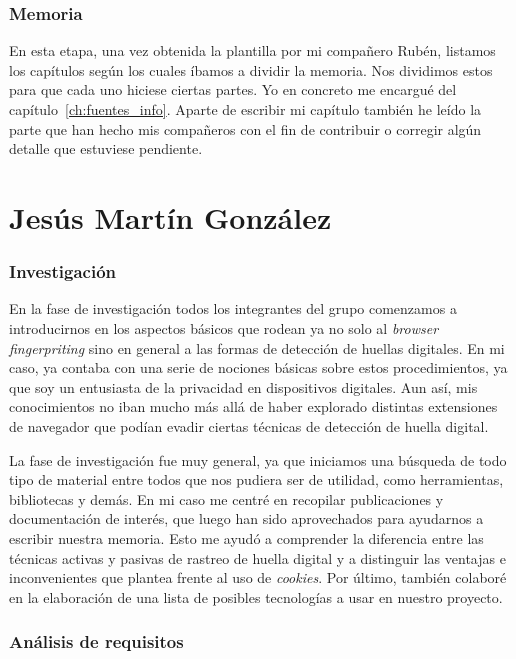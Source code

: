 \subsubsection{Memoria}
En esta etapa, una vez obtenida la plantilla por mi compañero Rubén, listamos los capítulos según los cuales íbamos a dividir la memoria. Nos dividimos estos para que cada uno hiciese ciertas partes. Yo en concreto me encargué del capítulo~\ref{ch:fuentes_info}. Aparte de escribir mi capítulo también he leído la parte que han hecho mis compañeros con el fin de contribuir o corregir algún detalle que estuviese pendiente.


\section{Jesús Martín González}
\subsubsection{Investigación}
En la fase de investigación todos los integrantes del grupo comenzamos a introducirnos en los aspectos básicos que rodean ya no solo al \textit{browser fingerpriting} sino en general a las formas de detección de huellas digitales. En mi caso, ya contaba con una serie de nociones básicas sobre estos procedimientos, ya que soy un entusiasta de la privacidad en dispositivos digitales. Aun así, mis conocimientos no iban mucho más allá de haber explorado distintas extensiones de navegador que podían evadir ciertas técnicas de detección de huella digital. \par

La fase de investigación fue muy general, ya que iniciamos una búsqueda de todo tipo de material entre todos que nos pudiera ser de utilidad, como herramientas, bibliotecas y demás. En mi caso me centré en recopilar publicaciones y documentación de interés, que luego han sido aprovechados para ayudarnos a escribir nuestra memoria. Esto me ayudó a comprender la diferencia entre las técnicas activas y pasivas de rastreo de huella digital y a distinguir las ventajas e inconvenientes que plantea frente al uso de \emph{cookies}. Por último, también colaboré en la elaboración de una lista de posibles tecnologías a usar en nuestro proyecto. \par

\subsubsection{Análisis de requisitos}

